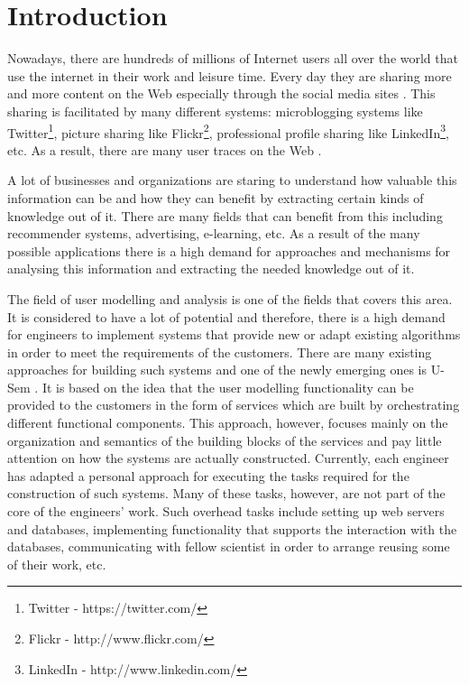 
\chapter{\label{cha:intro}Introduction}

Nowadays, there are hundreds of millions of Internet users all over the world that use the internet in their work and leisure time. Every day they are sharing more and more content on the Web especially through the social media sites \cite{kaplan2010users}. This sharing is facilitated by many different systems: microblogging systems like Twitter\footnote{Twitter - https://twitter.com/}, picture sharing like Flickr\footnote{Flickr - http://www.flickr.com/}, professional profile sharing like LinkedIn\footnote{LinkedIn - http://www.linkedin.com/}, etc. As a result, there are many user traces on the Web \cite{abel2010interweaving}.

A lot of businesses and organizations are staring to understand how valuable this information can be and how they can benefit by extracting certain kinds of knowledge out of it. There are many fields that can benefit from this including recommender systems, advertising, e-learning, etc. As a result of the many possible applications there is a high demand for approaches and mechanisms for analysing this information and extracting the needed knowledge out of it. 

The field of user modelling and analysis is one of the fields that covers this area. It is considered to have a lot of potential \cite{brusilovsky2007adaptive} and therefore, there is a high demand for engineers to implement systems that provide new or adapt existing algorithms in order to meet the requirements of the customers. There are many existing approaches for building such systems \cite{kobsa2001generic} and one of the newly emerging ones is U-Sem \cite{abel2011u}. It is based on the idea that the user modelling functionality can be provided to the customers in the form of services which are built by orchestrating different functional components. This approach, however, focuses mainly on the organization and semantics of the building blocks of the services and pay little attention on how the systems are actually constructed. Currently, each engineer has adapted a personal approach for executing the tasks required for the construction of such systems. Many of these tasks, however, are not part of the core of the engineers' work. Such overhead tasks include setting up web servers and databases, implementing functionality that supports the interaction with the databases, communicating with fellow scientist in order to arrange reusing some of their work, etc. 


